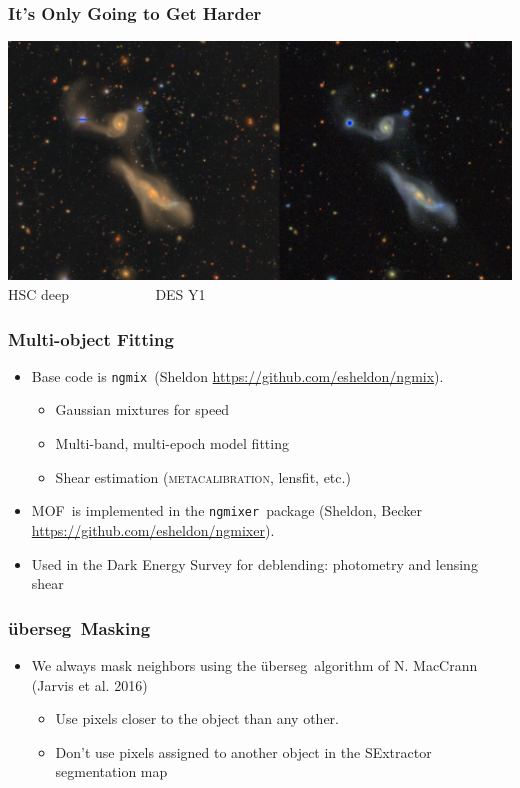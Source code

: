 \documentclass{beamer}
\newcommand{\mcal}{\textsc{metacalibration}}
\newcommand{\ngmix}{\texttt{ngmix}}
\newcommand{\ngmixer}{\texttt{ngmixer}}
\newcommand{\uberseg}{{\color{lightsteelblue} {\"u}berseg}}
\newcommand{\MOF}{{\color{brightred}MOF}}
\begin{document}
\frame
{
    \frametitle{It's Only Going to Get Harder}
 
    \begin{center}
        \includegraphics[width=\columnwidth]{HSC-DES-interacting-pair.jpg}
        \newline
         HSC deep  ~~~~~~~~~~~ DES Y1
    \end{center}


}

\frame
{

    \frametitle{Multi-object Fitting}

    \begin{itemize}
        \item Base code is \ngmix\ (Sheldon \url{https://github.com/esheldon/ngmix}).
            \begin{itemize}
                \item Gaussian mixtures for speed
                \item Multi-band, multi-epoch model fitting
                \item Shear estimation (\mcal, lensfit, etc.)
            \end{itemize}

        \item \MOF\ is implemented in the \ngmixer\ package (Sheldon, Becker \url{https://github.com/esheldon/ngmixer}).

        \item Used in the Dark Energy Survey for deblending:  photometry and lensing shear

    \end{itemize}

}

\frame
{

    \frametitle{\uberseg\ Masking}

    \begin{itemize}

        \item We always mask neighbors using the \uberseg\ algorithm of N.
            MacCrann (Jarvis et al. 2016)

        \begin{itemize}
            \item Use pixels closer to the object than any other.
            \item Don't use pixels assigned to another
                object in the SExtractor segmentation map
        \end{itemize}
    \end{itemize}

}
\end{document}

